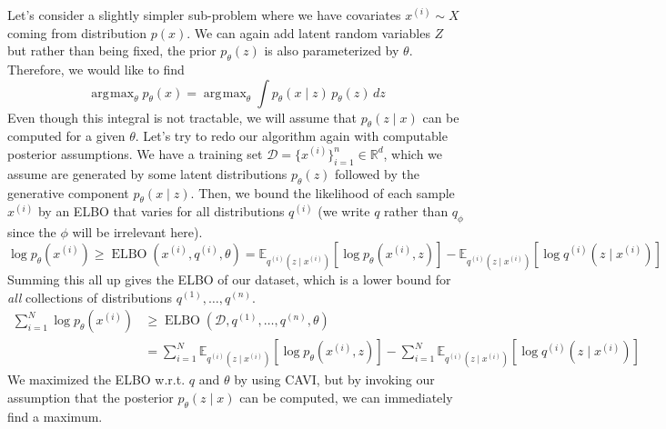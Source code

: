 \documentclass{article}
\DeclareMathOperator{\elbo}{ELBO}
\DeclareMathOperator*{\argmax}{\arg\!\max}
\begin{document}
  Let's consider a slightly simpler sub-problem where we have covariates $x^{(i)} \sim X$ coming from distribution $p(x)$. We can again add latent random variables $Z$ but rather than being fixed, the prior $p_\theta (z)$ is also parameterized by $\theta$. Therefore, we would like to find 
  \begin{equation}
    \argmax_\theta p_\theta (x) = \argmax_\theta \int p_\theta (x \mid z) \, p_\theta (z) \,dz
  \end{equation} 
  Even though this integral is not tractable, we will assume that $p_\theta (z \mid x)$ can be computed for a given $\theta$. Let's try to redo our algorithm again with computable posterior assumptions. We have a training set $\mathcal{D} = \{x^{(i)}\}_{i=1}^n \in \mathbb{R}^d$, which we assume are generated by some latent distributions $p_\theta (z)$ followed by the generative component $p_\theta (x \mid z)$. Then, we bound the likelihood of each sample $x^{(i)}$ by an ELBO that varies for all distributions $q^{(i)}$ (we write $q$ rather than $q_\phi$ since the $\phi$ will be irrelevant here). 
  \begin{equation}
    \log p_{\theta} (x^{(i)}) \geq \elbo(x^{(i)}, q^{(i)}, \theta) = \mathbb{E}_{q^{(i)} (z \mid x^{(i)})} [ \log p_{\theta} (x^{(i)}, z)] - \mathbb{E}_{q^{(i)} (z \mid x^{(i)})} [ \log q^{(i)} (z \mid x^{(i)}) ]
  \end{equation} 
  Summing this all up gives the ELBO of our dataset, which is a lower bound for \textit{all} collections of distributions $q^{(1)}, \ldots, q^{(n)}$. 
  \begin{align}
    \sum_{i=1}^N \log p_{\theta} (x^{(i)}) & \geq \elbo(\mathcal{D}, q^{(1)}, \ldots, q^{(n)}, \theta) \\ 
                                           & = \sum_{i=1}^N \mathbb{E}_{q^{(i)} (z \mid x^{(i)})} [ \log p_{\theta} (x^{(i)}, z)] - \sum_{i=1}^N \mathbb{E}_{q^{(i)} (z \mid x^{(i)})} [ \log q^{(i)} (z \mid x^{(i)}) ]
  \end{align} 
  We maximized the ELBO w.r.t. $q$ and $\theta$ by using CAVI, but by invoking our assumption that the posterior $p_\theta (z \mid x)$ can be computed, we can immediately find a maximum. 
\end{document}
